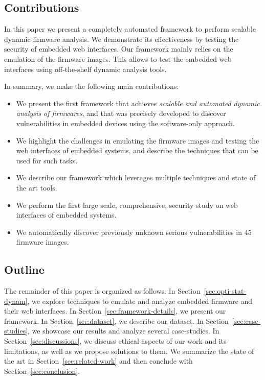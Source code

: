 \documentclass[conference]{./templates/ndss/IEEEtran}
\newcounter{t0d0_counter}
\newcounter{pr00f_counter}
\newcommand{\CountFirmwareDynVulnTotalHigh}{45} \newcommand{\CountFirmwareDynVulnTotalLow}{23} \newcommand{\CountFirmwareDynVulnCmdInj}{21}
\begin{document}
\subsection{Contributions}
\label{sec:contrib}

In this paper we present a completely automated framework to 
perform scalable dynamic firmware analysis. We demonstrate its effectiveness 
by testing the security of embedded web interfaces. Our framework mainly 
relies on the emulation of the firmware images. This allows to test the 
embedded web interfaces using off-the-shelf dynamic analysis tools. 

\noindent In summary, we make the following main contributions:

\begin{itemize}

\item We present the first framework that achieves \emph{scalable and automated 
dynamic analysis of firmwares}, and that was precisely developed to 
discover vulnerabilities in embedded devices using the software-only approach. 

\item We highlight the challenges in emulating the firmware images and testing the web interfaces of 
 embedded systems, and describe the techniques that can be used for such tasks. 

\item We describe our framework which leverages multiple techniques and
  state of the art tools.

\item We perform the first large scale, comprehensive, security study on
  web interfaces of embedded systems.

\item We automatically discover \CountDynVulnsTotalHigh{} previously
  unknown serious vulnerabilities in \CountFirmwareDynVulnTotalHigh{} firmware
  images. 




\end{itemize}







\subsection{Outline}
\label{sec:outline}

The remainder of this paper is organized as follows. 
In Section~\ref{sec:opti-stat-dynam}, we explore techniques to emulate and 
analyze embedded firmware and their web interfaces. 
In Section~\ref{sec:framework-details}, we present our framework. 
In Section~\ref{sec:dataset}, we describe our dataset.
In Section~\ref{sec:case-studies}, we showcase our results and analyze
several case-studies. 
In Section~\ref{sec:discussions}, we discuss ethical aspects of our work 
and its limitations, as well as we propose solutions to them. 
We summarize the state of the art in Section~\ref{sec:related-work} and 
then conclude with Section~\ref{sec:conclusion}. 
\end{document}
